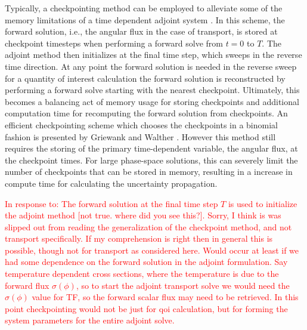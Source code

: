 \documentclass[12pt]{report}
\newcommand{\comment}[2]{\marginpar{\textcolor{#2}{$\star$}}\textcolor{#2}{#1}\newline}
\newcommand{\iwh}[1]{\comment{#1}{red}}
\newcommand{\iwh}[1]{\phantom{a}}
\begin{document}
Typically, a checkpointing method can be employed to alleviate some of the memory limitations of a time dependent adjoint system \cite{Carey} \cite{Griewank}. In this scheme, the forward solution, i.e., the angular flux in the case of transport, is stored at checkpoint timesteps when performing a forward solve from $t=0$ to $T$. The adjoint method then initializes at the final time step, which sweeps in the reverse time direction. At any point the forward solution is needed in the reverse sweep for a quantity of interest calculation the forward solution is reconstructed by performing a forward solve starting with the nearest checkpoint. Ultimately, this becomes a balancing act of memory usage for storing checkpoints and additional computation time for recomputing the forward solution from checkpoints. An efficient checkpointing scheme which chooses the checkpoints in a binomial fashion is presented by Griewank and Walther \cite{Griewank}. However this method still requires the storing of the primary time-dependent variable, the angular flux, at the checkpoint times. For large phase-space solutions, this can severely limit the number of checkpoints that can be stored in memory, resulting in a increase in compute time for calculating the uncertainty propagation.

\iwh{In response to: The forward solution at the final time step $T$ is used to initialize the adjoint method [not true. where did you see this?]. Sorry, I think is was slipped out from reading the generalization of the checkpoint method, and not transport specifically. If my comprehension is right then in general this is possible, though not for transport as considered here. Would occur at least if we had some dependence on the forward solution in the adjoint formulation. Say temperature dependent cross sections, where the temperature is due to the forward flux $\sigma(\phi)$, so to start the adjoint transport solve we would need the $\sigma(\phi)$ value for TF, so the forward scalar flux may need to be retrieved. In this point checkpointing would not be just for qoi calculation, but for forming the system parameters for the entire adjoint solve. }
\end{document}
